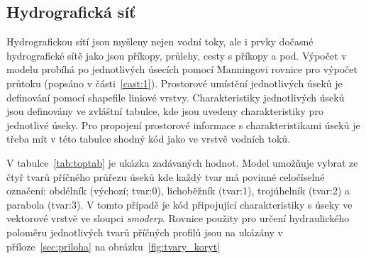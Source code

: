 % 
% 
% 
% 
% 







\subsection{Hydrografická síť} \label{sec:vodnitoky}

Hydrografickou sítí jsou myšleny nejen vodní toky, ale i prvky dočasné hydrografické sítě jako jsou příkopy, průlehy, cesty s příkopy a pod. Výpočet v modelu probíhá po jednotlivých úsecích pomocí Manningovi rovnice pro výpočet průtoku (popsáno v části~\ref{cast:1}). Prostorové umístění jednotlivých úseků je definování pomocí shapefile liniové vrstvy. Charakteristiky jednotlivých úseků jsou definovány ve zvláštní tabulce,  kde jsou uvedeny charakteristiky pro jednotlivé úseky. Pro propojení prostorové informace s charakteristikami úseků je třeba mít v této tabulce shodný kód jako ve vrstvě vodních toků.

V tabulce~\ref{tab:toptab} je ukázka zadávaných hodnot.  Model umožňuje vybrat ze čtyř tvarů příčného průřezu úseků kde každý tvar má povinné celočíselné označení: obdélník (výchozí; tvar:0), lichoběžník (tvar:1), trojúhelník (tvar:2) a parabola (tvar:3). V tomto případě je kód připojující charakteristiky s úseky ve vektorové vrstvě ve sloupci {\it smoderp}. Rovnice použity pro určení hydraulického poloměru jednotlivých tvarů příčných profilů jsou na ukázány v příloze~\ref{sec:priloha} na obrázku~\ref{fig:tvary_koryt}
% 

